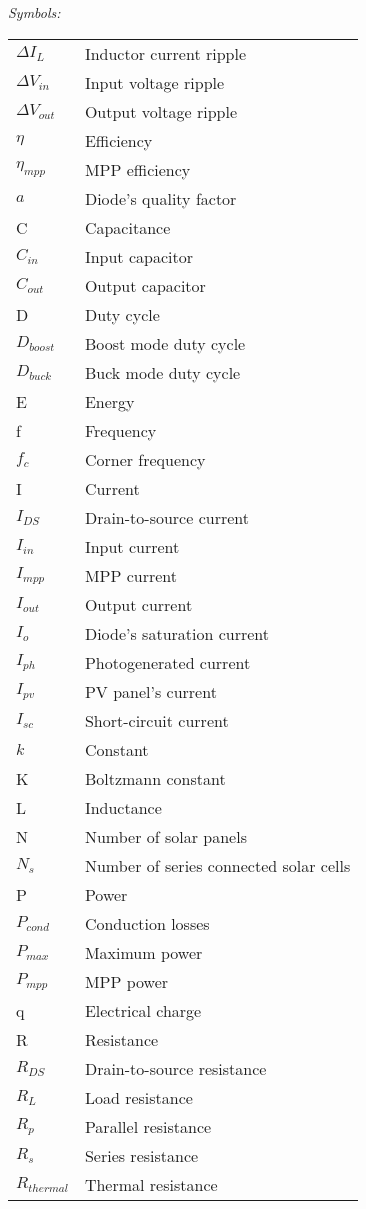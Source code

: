 \vspace{5mm} %
\newpage
\noindent\textit{Symbols:}\newline
\begin{tabular}{ll}
$\Delta I_{L}$ & Inductor current ripple\\
$\Delta V_{in}$ & Input voltage ripple\\
$\Delta V_{out}$ & Output voltage ripple\\
$\eta$ & Efficiency\\
$\eta_{mpp}$ & MPP efficiency\\
$a$ & Diode's quality factor \\
C & Capacitance\\
$C_{in}$ & Input capacitor\\
$C_{out}$ & Output capacitor\\
D & Duty cycle\\
$D_{boost}$ & Boost mode duty cycle\\
$D_{buck}$ & Buck mode duty cycle\\
E & Energy\\
f & Frequency\\
$f_{c}$ & Corner frequency \\
I & Current\\
$I_{DS}$ & Drain-to-source current \\
$I_{in}$ & Input current \\
$I_{mpp}$ & MPP current\\
$I_{out}$ & Output current \\
$I_{o}$ & Diode's saturation current \\
$I_{ph}$ & Photogenerated current \\
$I_{pv}$ & PV panel's current \\
$I_{sc}$ & Short-circuit current\\
$k$ & Constant \\
K & Boltzmann constant \\
L & Inductance\\
N & Number of solar panels \\
$N_{s}$ & Number of series connected solar cells \\
P & Power\\
$P_{cond}$ & Conduction losses \\
$P_{max}$ & Maximum power \\
$P_{mpp}$ & MPP power \\
q & Electrical charge \\
R & Resistance\\
$R_{DS}$ & Drain-to-source resistance\\
$R_{L}$ & Load resistance\\
$R_{p}$ & Parallel resistance \\
$R_{s}$ & Series resistance \\
$R_{thermal}$ & Thermal resistance\\
\end{tabular}
\newpage


